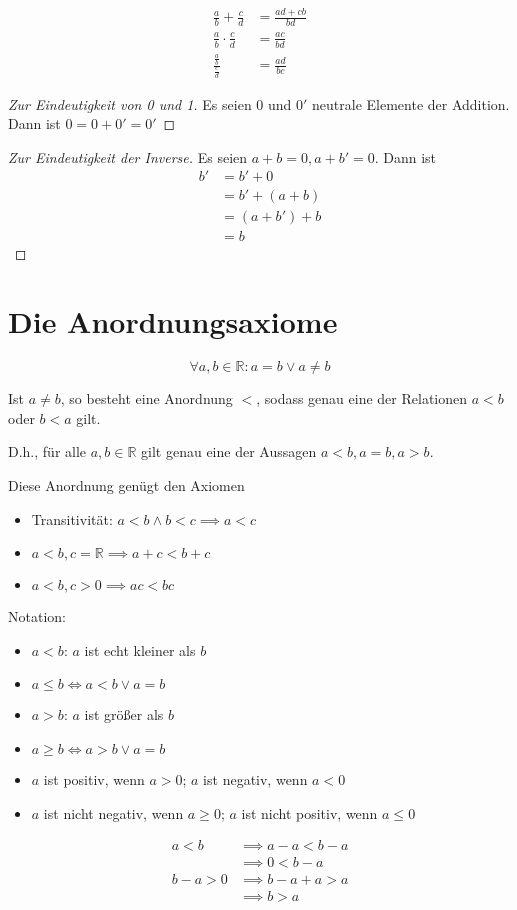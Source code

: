 \begin{theorem}
  \begin{align*}
    \frac{a}{b} + \frac{c}{d} &= \frac{ad+cb}{bd} \\
    \frac{a}{b} \cdot \frac{c}{d} &= \frac{ac}{bd} \\
    \frac{\frac{a}{b}}{\frac{c}{d}} &= \frac{ad}{bc}
  \end{align*}
\end{theorem}

\begin{proof}[Zur Eindeutigkeit von 0 und 1]
  Es seien 0 und $0'$ neutrale Elemente der Addition. Dann ist $0 = 0 + 0' = 0'$
\end{proof}
\begin{proof}[Zur Eindeutigkeit der Inverse]
  Es seien $a + b = 0, a + b' = 0$. Dann ist
  \begin{align*}
    b' &= b' + 0 \\
    \,&= b' + (a + b) \\
    \,&= (a + b') + b \\
    \,&= b
  \end{align*}
\end{proof}

\section{Die Anordnungsaxiome}
\[ \forall a, b \in \mathbb{R}: a = b \vee a \ne b \]

Ist $a \ne b$, so besteht eine Anordnung $<$, sodass genau eine der Relationen $a < b$ oder $b < a$ gilt.

D.h., für alle $a, b \in \mathbb{R}$ gilt genau eine der Aussagen $a < b, a = b, a > b$.

Diese Anordnung genügt den Axiomen
\begin{itemize}
\item Transitivität: $a < b \wedge b < c \implies a < c$
\item $a < b, c = \mathbb{R} \implies a + c < b + c$
\item $a < b, c > 0 \implies ac < bc$
\end{itemize}

\begin{definition}
  Notation:
  \begin{itemize}
  \item $a < b$: $a$ ist echt kleiner als $b$
  \item $a \le b \iff a < b \vee a = b$
  \item $a > b$: $a$ ist größer als $b$
  \item $a \ge b \iff a > b \vee a = b$
  \item $a$ ist positiv, wenn $a > 0$; $a$ ist negativ, wenn $a < 0$
  \item $a$ ist nicht negativ, wenn $a \ge 0$; $a$ ist nicht positiv, wenn $a \le 0$
  \end{itemize}
\end{definition}

\begin{example}
  \begin{align*}
    a < b &\implies a-a < b-a \\
    \,&\implies 0 < b-a \\
    b-a > 0 &\implies b-a+a > a \\
    \,&\implies b > a
  \end{align*}
\end{example}